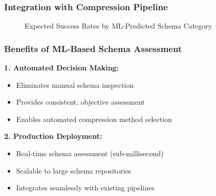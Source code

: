 \subsubsection{Integration with Compression Pipeline}

\begin{figure}[H]
\centering
{}
\caption{Expected Success Rates by ML-Predicted Schema Category}
\label{fig:ml_predicted_success}
\end{figure}

\subsubsection{Benefits of ML-Based Schema Assessment}

\textbf{1. Automated Decision Making:}
\begin{itemize}
    \item Eliminates manual schema inspection
    \item Provides consistent, objective assessment
    \item Enables automated compression method selection
\end{itemize}

\textbf{2. Production Deployment:}
\begin{itemize}
    \item Real-time schema assessment (sub-millisecond)
    \item Scalable to large schema repositories
    \item Integrates seamlessly with existing pipelines
\end{itemize}


